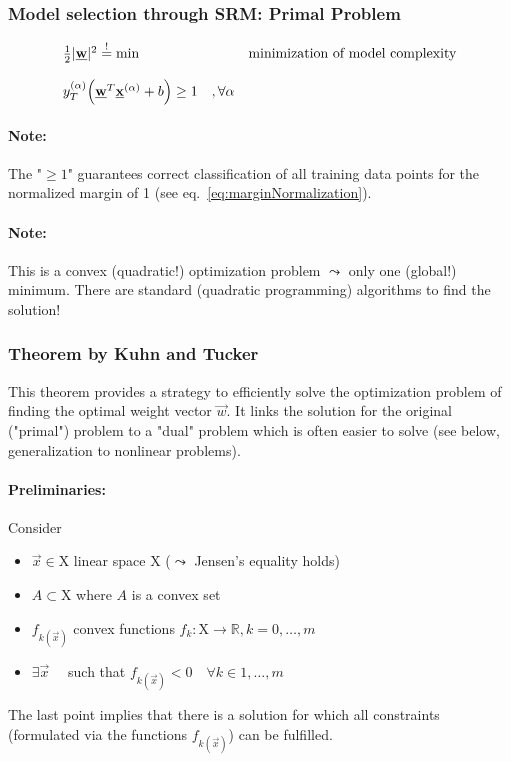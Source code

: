 \subsubsection*{Model selection through SRM: Primal Problem}
\[ \begin{array}{ll}
	\frac{1}{2} |\underline{\mathbf{w}}|^2 \stackrel{\mathrm{!}}{=} \min 
	& \text{minimization of model complexity} \\\\
	y_T^{(\alpha)} \Big( \underline{\mathbf{w}}^T \underline{\mathbf{x}}^{(\alpha)} + b \Big) \geq 1 \quad
		, \forall \alpha
\end{array} \]
\paragraph{Note:} The "$\geq 1$" guarantees correct classification of all training data points for the normalized margin of 1 (see eq.~\ref{eq:marginNormalization}).
\paragraph{Note:} This is a convex (quadratic!) optimization problem
$\leadsto$ only one (global!) minimum. There are standard (quadratic
programming) algorithms to find the solution!

\subsubsection*{Theorem by Kuhn and Tucker}
This theorem provides a strategy to efficiently solve the optimization
problem of finding the optimal weight vector $\vec{w}$. It links the 
solution for the original ("primal") problem to a "dual" problem which is often easier to solve (see below, generalization to nonlinear problems).
\paragraph{Preliminaries: } Consider
\begin{itemize}
\item $\vec{x} \in \mathrm{X} $ linear space $\mathrm{X}$ ($\leadsto$ Jensen's equality holds)
\item $A \subset \mathrm{X}$ where $A$ is a convex set 
\item $f_{k (\vec{x})}$ convex functions $f_k: \mathrm{X} \rightarrow \mathbb{R}, k = 0, \ldots, m$
\item $\exists \vec{x} \quad$ such that $f_{k (\vec{x})} < 0 \quad \forall k
  \in 1, \ldots, m$
\end{itemize}
The last point implies that there is a solution for which all constraints (formulated via the functions $f_{k (\vec{x})}$) can be fulfilled. \\
